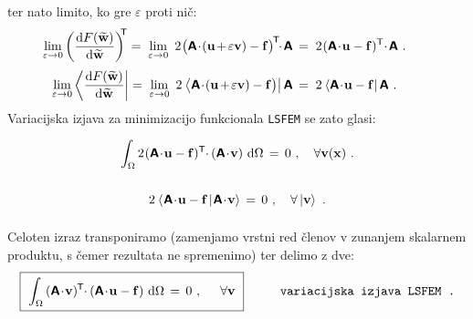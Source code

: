 ter nato limito, ko gre $\varepsilon$ proti nič:
\begin{equation*}
	\hspace{-7mm}
	\lim_{\varepsilon \rightarrow 0} \left(\frac{\ud F(\widetilde{\mathbf{w}})}{\ud \widetilde{\mathbf{w}}}\right)^\mathsf{\mkern-7mu T}
	=
	\mkern5mu \lim_{\varepsilon \rightarrow 0} \ 2 \mkern1mu \big(\mathbsf{A} \! \cdot \! (\mathbf{u} \mkern-2mu + \mkern-2mu \varepsilon \mathbf{v}) - \mathbf{f}\big)^\mathsf{\mkern-2mu T} \mkern-6mu \cdot \mkern-2mu \mathbsf{A}\,
	=
	\mkern5mu 2 \mkern1mu (\mathbsf{A} \! \cdot \! \mathbf{u} - \mathbf{f})^\mathsf{T} \mkern-4mu \cdot \mkern-2mu \mathbsf{A} \ .
\end{equation*}
\begin{equation*}
	\hspace{-7mm}
	\lim_{\varepsilon \rightarrow 0} \bra{\frac{\ud F(\widetilde{\mathbf{w}})}{\ud \widetilde{\mathbf{w}}}}
	=
	\mkern5mu \lim_{\varepsilon \rightarrow 0} \ 2 \mkern1mu \bra{\mathbsf{A} \! \cdot \! (\mathbf{u} \mkern-2mu + \mkern-2mu \varepsilon \mathbf{v}) - \mathbf{f}\big)} \mathbsf{A}\,
	=
	\mkern5mu 2 \mkern1mu \bra{\mathbsf{A} \! \cdot \! \mathbf{u} - \mathbf{f}} \mathbsf{A} \ .
\end{equation*}
Variacijska izjava za minimizacijo funkcionala \texttt{LSFEM} se zato glasi:
\begin{equation*}
	\int_{\Omega} 2 \mkern1mu (\mathbsf{A} \! \cdot \! \mathbf{u} - \mathbf{f})^\mathsf{T} \mkern-4.5mu \cdot \mkern-1mu (\mathbsf{A} \! \cdot \! \mathbf{v}) \ \ud \Omega \, = \, 0 \ , \quad \forall \mathbf{v(\mathbf{x})} \ . \vphantom{\Biggr{)}}
\end{equation*}
\begin{equation*}
	2 \mkern1mu \bra{\mkern1mu \mathbsf{A} \! \cdot \! \mathbf{u} - \mathbf{f} \mkern2mu}\ket{\mkern1mu \mathbsf{A} \! \cdot \! \mathbf{v}} \, = \, 0 \ , \quad \forall \ket{\mathbf{v}} \ . \vphantom{\Biggr{)}}
\end{equation*}
Celoten izraz transponiramo (zamenjamo vrstni red členov v zunanjem skalarnem produktu, s čemer rezultata ne spremenimo) ter delimo z dve:
\begin{equation}
	\boxed{\
		\int_{\Omega} \, (\mathbsf{A} \! \cdot \! \mathbf{v})^\mathsf{\mkern-1mu T} \mkern-4.5mu \cdot \mkern-1mu (\mathbsf{A} \! \cdot \! \mathbf{u} - \mathbf{f}) \ \ud \Omega \, = \,
		0 \ , \hspace{5mm} \forall \mathbf{v} \vphantom{\bigg{)}} \
	}
	\hspace{10mm} \texttt{variacijska izjava LSFEM .}
	\label{eq:LsfemVariationalStatement1}
\end{equation}
